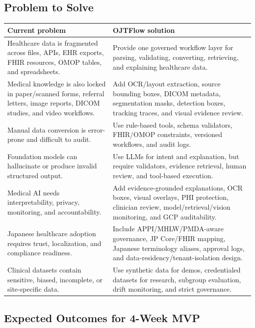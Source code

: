 \documentclass[11pt,a4paper]{article}
\begin{document}
\subsection{Problem to Solve}

\begin{tabularx}{\textwidth}{p{}X}
\toprule
\textbf{Current problem} & \textbf{OJTFlow solution} \\
\midrule
Healthcare data is fragmented across files, APIs, EHR exports, FHIR resources, OMOP tables, and spreadsheets. & Provide one governed workflow layer for parsing, validating, converting, retrieving, and explaining healthcare data. \\
Medical knowledge is also locked in paper/scanned forms, referral letters, image reports, DICOM studies, and video workflows. & Add OCR/layout extraction, source bounding boxes, DICOM metadata, segmentation masks, detection boxes, tracking traces, and visual evidence review. \\
Manual data conversion is error-prone and difficult to audit. & Use rule-based tools, schema validators, FHIR/OMOP constraints, versioned workflows, and audit logs. \\
Foundation models can hallucinate or produce invalid structured output. & Use LLMs for intent and explanation, but require validators, evidence retrieval, human review, and tool-based execution. \\
Medical AI needs interpretability, privacy, monitoring, and accountability. & Add evidence-grounded explanations, OCR boxes, visual overlays, PHI protection, clinician review, model/retrieval/vision monitoring, and GCP auditability. \\
Japanese healthcare adoption requires trust, localization, and compliance readiness. & Include APPI/MHLW/PMDA-aware governance, JP Core/FHIR mapping, Japanese terminology aliases, approval logs, and data-residency/tenant-isolation design. \\
Clinical datasets contain sensitive, biased, incomplete, or site-specific data. & Use synthetic data for demos, credentialed datasets for research, subgroup evaluation, drift monitoring, and strict governance. \\
\bottomrule
\end{tabularx}

\subsection{Expected Outcomes for 4-Week MVP}
\end{document}
